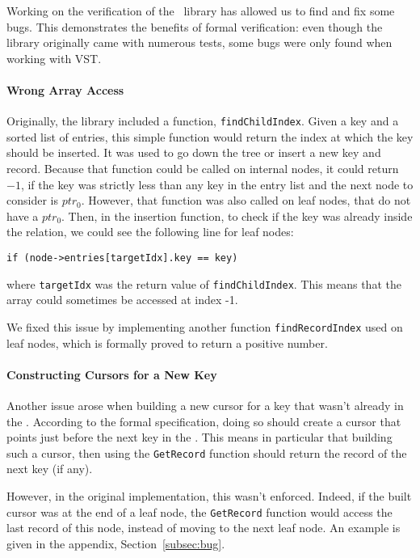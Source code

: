 Working on the verification of the \btrees\ library has allowed us to find and fix some bugs.
This demonstrates the benefits of formal verification: even though the library originally came with numerous tests, some bugs were only found when working with VST.

\paragraph{Wrong Array Access} Originally, the library included a function, \lstinline{findChildIndex}.
Given a key and a sorted list of entries, this simple function would return the index at which the key should be inserted.
It was used to go down the tree or insert a new key and record.
Because that function could be called on internal nodes, it could return $-1$, if the key was strictly less than any key in the entry list and the next node to consider is $ptr_0$.
However, that function was also called on leaf nodes, that do not have a $ptr_0$.
Then, in the insertion function, to check if the key was already inside the relation, we could see the following line for leaf nodes:
\begin{lstlisting}
if (node->entries[targetIdx].key == key)
\end{lstlisting}
where \lstinline{targetIdx} was the return value of \lstinline{findChildIndex}.
This means that the array could sometimes be accessed at index -1.

We fixed this issue by implementing another function \lstinline{findRecordIndex} used on leaf nodes, which is formally proved to return a positive number.

\paragraph{Constructing Cursors for a New Key}
Another issue arose when building a new cursor for a key that wasn't already in the \btree.
According to the formal specification, doing so should create a cursor that points just before the next key in the \btree.
This means in particular that building such a cursor, then using the \lstinline{GetRecord} function should return the record of the next key (if any).

However, in the original implementation, this wasn't enforced.
Indeed, if the built cursor was at the end of a leaf node, the \lstinline{GetRecord} function would access the last record of this node, instead of moving to the next leaf node.
An example is given in the appendix, Section~\ref{subsec:bug}.

